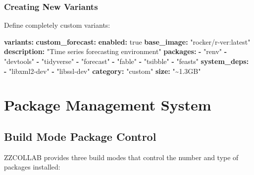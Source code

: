 \documentclass[
]{article}
\newenvironment{Shaded}{\begin{snugshade}}{\end{snugshade}}
\newcommand{\AttributeTok}[1]{\textcolor[rgb]{0.13,0.29,0.53}{#1}}
\newcommand{\CharTok}[1]{\textcolor[rgb]{0.31,0.60,0.02}{#1}}
\newcommand{\FunctionTok}[1]{\textcolor[rgb]{0.13,0.29,0.53}{\textbf{#1}}}
\newcommand{\KeywordTok}[1]{\textcolor[rgb]{0.13,0.29,0.53}{\textbf{#1}}}
\newcommand{\StringTok}[1]{\textcolor[rgb]{0.31,0.60,0.02}{#1}}
\begin{document}
\subsubsection{Creating New Variants}\label{creating-new-variants}

Define completely custom variants:

\begin{Shaded}
\begin{Highlighting}[]
\FunctionTok{variants}\KeywordTok{:}
\AttributeTok{  }\FunctionTok{custom\_forecast}\KeywordTok{:}
\AttributeTok{    }\FunctionTok{enabled}\KeywordTok{:}\AttributeTok{ }\CharTok{true}
\AttributeTok{    }\FunctionTok{base\_image}\KeywordTok{:}\AttributeTok{ }\StringTok{"rocker/r{-}ver:latest"}
\AttributeTok{    }\FunctionTok{description}\KeywordTok{:}\AttributeTok{ }\StringTok{"Time series forecasting environment"}
\AttributeTok{    }\FunctionTok{packages}\KeywordTok{:}
\AttributeTok{      }\KeywordTok{{-}}\AttributeTok{ }\StringTok{"renv"}
\AttributeTok{      }\KeywordTok{{-}}\AttributeTok{ }\StringTok{"devtools"}
\AttributeTok{      }\KeywordTok{{-}}\AttributeTok{ }\StringTok{"tidyverse"}
\AttributeTok{      }\KeywordTok{{-}}\AttributeTok{ }\StringTok{"forecast"}
\AttributeTok{      }\KeywordTok{{-}}\AttributeTok{ }\StringTok{"fable"}
\AttributeTok{      }\KeywordTok{{-}}\AttributeTok{ }\StringTok{"tsibble"}
\AttributeTok{      }\KeywordTok{{-}}\AttributeTok{ }\StringTok{"feasts"}
\AttributeTok{    }\FunctionTok{system\_deps}\KeywordTok{:}
\AttributeTok{      }\KeywordTok{{-}}\AttributeTok{ }\StringTok{"libxml2{-}dev"}
\AttributeTok{      }\KeywordTok{{-}}\AttributeTok{ }\StringTok{"libssl{-}dev"}
\AttributeTok{    }\FunctionTok{category}\KeywordTok{:}\AttributeTok{ }\StringTok{"custom"}
\AttributeTok{    }\FunctionTok{size}\KeywordTok{:}\AttributeTok{ }\StringTok{"\textasciitilde{}1.3GB"}
\end{Highlighting}
\end{Shaded}

\section{Package Management System}\label{package-management-system}

\subsection{Build Mode Package
Control}\label{build-mode-package-control}

ZZCOLLAB provides three build modes that control the number and type of
packages installed:
\end{document}
